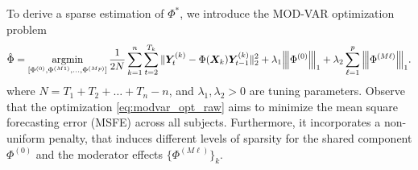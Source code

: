 To derive a sparse estimation of $\Phi^*$, we introduce the MOD-VAR optimization problem
\begin{equation}\label{eq:modvar_opt_raw}
    \hat\Phi = \mathop{\mathrm{argmin}}_{[\Phi^{(0)}, \Phi^{(M1)},\ldots , \Phi^{(Mp)}] } \frac{1}{2N}\sum_{k = 1}^n \sum_{t = 2}^{T_{k}} \| \bm{Y}^{(k)}_{t} - \Phi(\bm{X}_k) \bm{Y}^{(k)}_{t-1}  \|_2^2 + \lambda_1{\left\vert\kern-0.25ex\left\vert\kern-0.25ex\left\vert \Phi^{(0)} \right\vert\kern-0.25ex\right\vert\kern-0.25ex\right\vert}_1 + \lambda_2\sum_{\ell = 1}^p{\left\vert\kern-0.25ex\left\vert\kern-0.25ex\left\vert \Phi^{(M\ell)} \right\vert\kern-0.25ex\right\vert\kern-0.25ex\right\vert}_1 .
\end{equation}
where $N = T_1 + T_2 + \ldots + T_n - n$, and $\lambda_1,\lambda_2>0$ are tuning parameters. Observe that the optimization \eqref{eq:modvar_opt_raw} aims to minimize the mean square forecasting error (MSFE) across all subjects. Furthermore, it incorporates a non-uniform penalty, that induces different levels of sparsity for the shared component $\Phi^{(0)}$ and the moderator effects $\{\Phi^{(M\ell)}\}_{k}$.  

